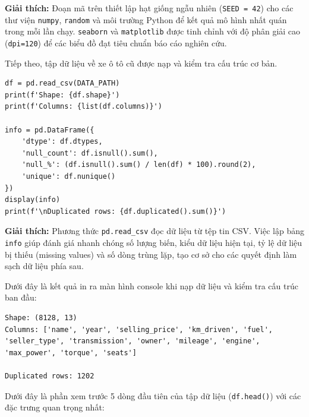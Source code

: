 \textbf{Giải thích:} Đoạn mã trên thiết lập hạt giống ngẫu nhiên (\texttt{SEED = 42}) cho các thư viện \texttt{numpy}, \texttt{random} và môi trường Python để kết quả mô hình nhất quán trong mỗi lần chạy. \texttt{seaborn} và \texttt{matplotlib} được tinh chỉnh với độ phân giải cao (\texttt{dpi=120}) để các biểu đồ đạt tiêu chuẩn báo cáo nghiên cứu.

Tiếp theo, tập dữ liệu về xe ô tô cũ được nạp và kiểm tra cấu trúc cơ bản.

\begin{lstlisting}[style=pythoncode, caption={Tải dữ liệu và kiểm tra cấu trúc}]
df = pd.read_csv(DATA_PATH)
print(f'Shape: {df.shape}')
print(f'Columns: {list(df.columns)}')

info = pd.DataFrame({
    'dtype': df.dtypes,
    'null_count': df.isnull().sum(),
    'null_%': (df.isnull().sum() / len(df) * 100).round(2),
    'unique': df.nunique()
})
display(info)
print(f'\nDuplicated rows: {df.duplicated().sum()}')
\end{lstlisting}

\textbf{Giải thích:} Phương thức \texttt{pd.read\_csv} đọc dữ liệu từ tệp tin CSV. Việc lập bảng \texttt{info} giúp đánh giá nhanh chóng số lượng biến, kiểu dữ liệu hiện tại, tỷ lệ dữ liệu bị thiếu (missing values) và số dòng trùng lặp, tạo cơ sở cho các quyết định làm sạch dữ liệu phía sau.

Dưới đây là kết quả in ra màn hình console khi nạp dữ liệu và kiểm tra cấu trúc ban đầu:

\begin{lstlisting}[style=consoleoutput, caption={Kết quả kiểm tra cấu trúc ban đầu và trùng lặp}]
Shape: (8128, 13)
Columns: ['name', 'year', 'selling_price', 'km_driven', 'fuel', 'seller_type', 'transmission', 'owner', 'mileage', 'engine', 'max_power', 'torque', 'seats']

Duplicated rows: 1202
\end{lstlisting}

Dưới đây là phần xem trước 5 dòng đầu tiên của tập dữ liệu (\texttt{df.head()}) với các đặc trưng quan trọng nhất:

